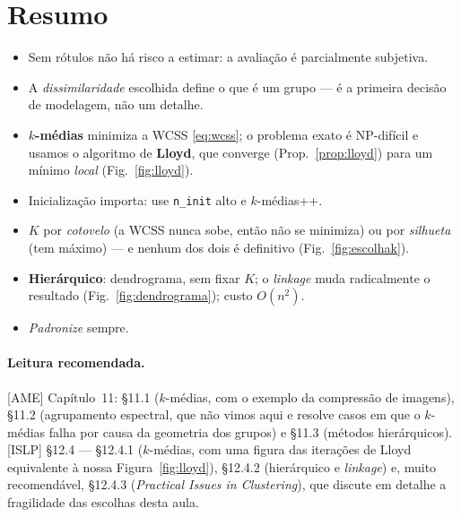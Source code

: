 \documentclass[11pt,a4paper]{article}
\begin{document}
\section*{Resumo}
\begin{itemize}[leftmargin=1.4cm]
  \item Sem rótulos não há risco a estimar: a avaliação é parcialmente subjetiva.
  \item A \emph{dissimilaridade} escolhida define o que é um grupo --- é a primeira
        decisão de modelagem, não um detalhe.
  \item \textbf{$k$-médias} minimiza a WCSS \eqref{eq:wcss}; o problema exato é
        NP-difícil e usamos o algoritmo de \textbf{Lloyd}, que converge
        (Prop.~\ref{prop:lloyd}) para um mínimo \emph{local}
        (Fig.~\ref{fig:lloyd}).
  \item Inicialização importa: use \texttt{n\_init} alto e $k$-médias++.
  \item $K$ por \emph{cotovelo} (a WCSS nunca sobe, então não se minimiza) ou por
        \emph{silhueta} (tem máximo) --- e nenhum dos dois é definitivo
        (Fig.~\ref{fig:escolhak}).
  \item \textbf{Hierárquico}: dendrograma, sem fixar $K$; o \emph{linkage} muda
        radicalmente o resultado (Fig.~\ref{fig:dendrograma}); custo $O(n^2)$.
  \item \emph{Padronize} sempre.
\end{itemize}

\paragraph{Leitura recomendada.} [AME] Capítulo~11: §11.1 ($k$-médias, com o
exemplo da compressão de imagens), §11.2 (agrupamento espectral, que não vimos aqui
e resolve casos em que o $k$-médias falha por causa da geometria dos grupos) e
§11.3 (métodos hierárquicos). [ISLP] §12.4 --- §12.4.1 ($k$-médias, com uma figura
das iterações de Lloyd equivalente à nossa Figura~\ref{fig:lloyd}), §12.4.2
(hierárquico e \emph{linkage}) e, muito recomendável, §12.4.3 (\emph{Practical
Issues in Clustering}), que discute em detalhe a fragilidade das escolhas desta
aula.
\end{document}

